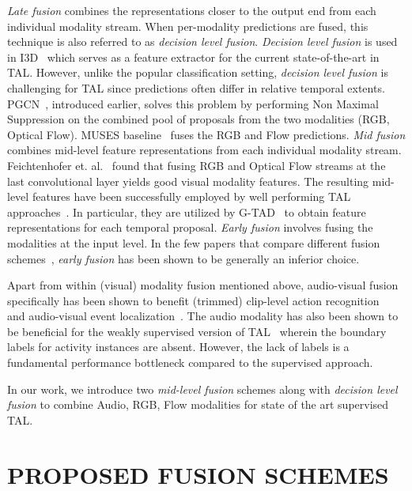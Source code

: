 \documentclass[10pt,twocolumn,letterpaper]{article}
\begin{document}
\textit{Late fusion} combines the representations closer to the output end from each individual modality stream. When per-modality predictions are fused, this technique is also referred to as \textit{decision level fusion}. \textit{Decision level fusion} is used in I3D~\cite{8099985} which serves as a feature extractor for the current state-of-the-art in TAL. However, unlike the popular classification setting, \textit{decision level fusion} is challenging for TAL since predictions often differ in relative temporal extents. PGCN~\cite{PGCN2019ICCV}, introduced earlier, solves this problem by performing Non Maximal Suppression on the combined pool of proposals from the two modalities (RGB, Optical Flow). MUSES baseline~\cite{Liu_2021_CVPR} fuses the RGB and Flow predictions. \textit{Mid fusion} combines mid-level feature representations from each individual modality stream. Feichtenhofer et. al.~\cite{feichtenhofer2016convolutional} found that fusing RGB and Optical Flow streams at the last convolutional layer yields good visual modality features. The resulting mid-level features have been successfully employed by well performing TAL approaches~\cite{Lin_Li_Wang_Tai_Luo_Cui_Wang_Li_Huang_Ji_2020,DBLP:journals/corr/abs-1907-09702,DBLP:journals/corr/abs-1806-02964,li2019deep}. In particular, they are utilized by G-TAD~\cite{PGCN2019ICCV} to obtain feature representations for each temporal proposal. \textit{Early fusion} involves fusing the modalities at the input level. In the few papers that compare different fusion schemes~\cite{inbook,tian2018audiovisual}, \textit{early fusion} has been shown to be generally an inferior choice. 

Apart from within (visual) modality fusion mentioned above, audio-visual fusion specifically has been shown to benefit (trimmed) clip-level action recognition~\cite{10.1145/2964284.2964328,8578915,b1bace6f29a746caa54afb1f42bcbf36,9010900} and audio-visual event localization~\cite{zhou2021positive,he2021multimodal,xu2020cross}. The audio modality has also been shown to be beneficial for the weakly supervised version of TAL~\cite{lee2021crossattentional} wherein the boundary labels for activity instances are absent. However, the lack of labels is a fundamental performance bottleneck compared to the supervised approach. 

In our work, we introduce two \textit{mid-level fusion} schemes along with \textit{decision level fusion} to combine Audio, RGB, Flow modalities for state of the art supervised TAL.  

\section{\uppercase{Proposed Fusion Schemes}}
\label{sec:fusionschemes}
\end{document}
